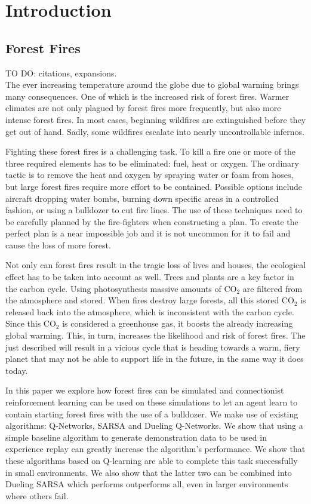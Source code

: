 \section{Introduction}\label{sec:introduction}

\subsection{Forest Fires}
TO DO: citations, expansions. \\

The ever increasing temperature around the globe due to global warming brings many consequences. One of which is the increased risk of forest fires. Warmer climates are not only plagued by forest fires more frequently, but also more intense forest fires.  In most cases, beginning wildfires are extinguished before they get out of hand. Sadly, some wildfires escalate into nearly uncontrollable infernos.

Fighting these forest fires is a challenging task. To kill a fire one or more of the three required elements has to be eliminated: fuel, heat or oxygen. The ordinary tactic is to remove the heat and oxygen by spraying water or foam from hoses, but large forest fires require more effort to be contained. Possible options include aircraft dropping water bombs, burning down specific areas in a controlled fashion, or using a bulldozer to cut fire lines. The use of these techniques need to be carefully planned by the fire-fighters when constructing a plan. To create the perfect plan is a near impossible job and it is not uncommon for it to fail and cause the loss of more forest.

Not only can forest fires result in the tragic loss of lives and houses, the ecological effect has to be taken into account as well. Trees and plants are a key factor in the carbon cycle. Using photosynthesis massive amounts of CO$_{2}$ are filtered from the atmosphere and stored. When fires destroy large forests, all this stored CO$_{2}$ is released back into the atmosphere, which is inconsistent with the carbon cycle. Since this CO$_{2}$ is considered a greenhouse gas, it boosts the already increasing global warming. This, in turn, increases the likelihood and risk of forest fires. The just described will result in a vicious cycle that is heading towards a warm, fiery planet that may not be able to support life in the future, in the same way it does today. 

In this paper we explore how forest fires can be simulated and connectionist reinforcement learning can be used on these simulations to let an agent learn to contain starting forest fires with the use of a bulldozer. We make use of existing algorithms: Q-Networks, SARSA and Dueling Q-Networks. We show that using a simple baseline algorithm to generate demonstration data to be used in experience replay can greatly increase the algorithm's performance. We show that these algorithms based on Q-learning are able to complete this task successfully in small environments. We also show that the latter two can be combined into Dueling SARSA which performs outperforms all, even in larger environments where others fail.

